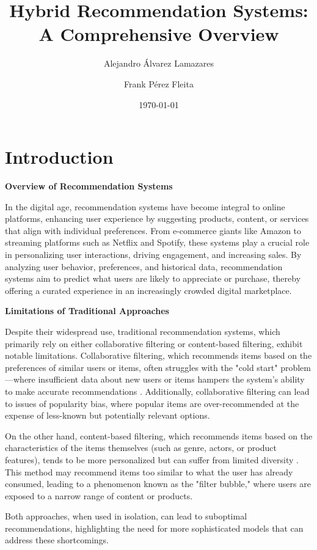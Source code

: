 \documentclass{article}
\title{Hybrid Recommendation Systems: A Comprehensive Overview}
\author{Alejandro Álvarez Lamazares \and Frank Pérez Fleita}
\date{\today}
\begin{document}
\maketitle

\section{Introduction}

\textbf{Overview of Recommendation Systems}

In the digital age, recommendation systems have become integral to online platforms, enhancing user experience by suggesting products, content, or services that align with individual preferences. From e-commerce giants like Amazon to streaming platforms such as Netflix and Spotify, these systems play a crucial role in personalizing user interactions, driving engagement, and increasing sales. By analyzing user behavior, preferences, and historical data, recommendation systems aim to predict what users are likely to appreciate or purchase, thereby offering a curated experience in an increasingly crowded digital marketplace.

\textbf{Limitations of Traditional Approaches}

Despite their widespread use, traditional recommendation systems, which primarily rely on either collaborative filtering or content-based filtering, exhibit notable limitations. Collaborative filtering, which recommends items based on the preferences of similar users or items, often struggles with the "cold start" problem—where insufficient data about new users or items hampers the system's ability to make accurate recommendations \cite{Aggarwal2016}. Additionally, collaborative filtering can lead to issues of popularity bias, where popular items are over-recommended at the expense of less-known but potentially relevant options.

On the other hand, content-based filtering, which recommends items based on the characteristics of the items themselves (such as genre, actors, or product features), tends to be more personalized but can suffer from limited diversity \cite{Bobadilla2013}. This method may recommend items too similar to what the user has already consumed, leading to a phenomenon known as the "filter bubble," where users are exposed to a narrow range of content or products.

Both approaches, when used in isolation, can lead to suboptimal recommendations, highlighting the need for more sophisticated models that can address these shortcomings.
\end{document}
